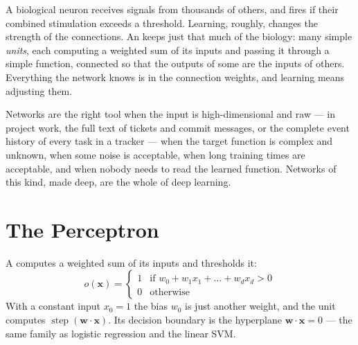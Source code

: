 A biological neuron receives signals from thousands of others, and fires if their
combined stimulation exceeds a threshold. Learning, roughly, changes the strength
of the connections. An  keeps just that much of
the biology: many simple \emph{units}, each computing a weighted sum of its inputs
and passing it through a simple function, connected so that the outputs of some are
the inputs of others. Everything the network knows is in the connection weights,
and learning means adjusting them.

Networks are the right tool when the input is high-dimensional and raw --- in
project work, the full text of tickets and commit messages, or the complete event
history of every task in a tracker --- when the target function is complex and
unknown, when some noise is acceptable, when long training times are acceptable,
and when nobody needs to read the learned function. Networks of this kind, made
deep, are the whole of deep learning.

\section{The Perceptron}

\begin{definitionbox}[Perceptron]
A  computes a weighted sum of its inputs and thresholds it:
\[
o(\mathbf{x}) =
\begin{cases} 1 & \text{if } w_0 + w_1 x_1 + \dots + w_d x_d > 0 \\ 0 & \text{otherwise} \end{cases}
\]
With a constant input $x_0 = 1$ the bias $w_0$ is just another weight, and the unit
computes $\operatorname{step}(\mathbf{w}\cdot\mathbf{x})$. Its decision boundary is the
hyperplane $\mathbf{w}\cdot\mathbf{x} = 0$ --- the same family as logistic regression
and the linear SVM.
\end{definitionbox}

